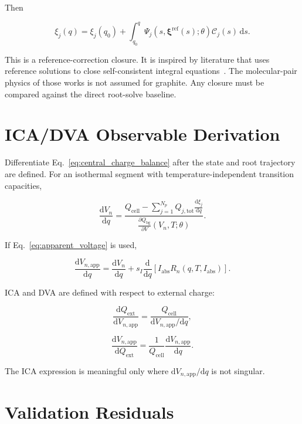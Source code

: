 \documentclass[11pt,a4paper]{article}
\newcommand{\dd}{\mathrm{d}}
\newcommand{\ext}{\mathrm{ext}}
\newcommand{\cell}{\mathrm{cell}}
\newcommand{\bg}{\mathrm{bg}}
\newcommand{\tot}{\mathrm{tot}}
\newcommand{\app}{\mathrm{app}}
\newcommand{\absI}{I_{\mathrm{abs}}}
\begin{document}
Then

\begin{equation}
\xi_j(q)
=
\xi_j(q_0)
+
\int_{q_0}^{q}
\Psi_j(s,\bm{\xi}^{\mathrm{ref}}(s);\theta)
\mathcal{C}_j(s)\,\dd s.
\label{eq:closure_integral}
\end{equation}

This is a reference-correction closure. It is inspired by literature that uses reference solutions to close self-consistent integral equations~\cite{Lee2011Propagator,Son2013Rates,Lee2017Field}. The molecular-pair physics of those works is not assumed for graphite. Any closure must be compared against the direct root-solve baseline.

\section{ICA/DVA Observable Derivation}

Differentiate Eq.~\eqref{eq:central_charge_balance} after the state and root trajectory are defined. For an isothermal segment with temperature-independent transition capacities,

\begin{equation}
\frac{\dd V_n}{\dd q}
=
\frac{
Q_{\cell}
-
\sum_{j=1}^{N_p}Q_{j,\tot}\frac{\dd \xi_j}{\dd q}
}{
\frac{\partial Q_{\bg}}{\partial V}(V_n,T;\theta)
}.
\label{eq:dVn_dq}
\end{equation}

If Eq.~\eqref{eq:apparent_voltage} is used,

\begin{equation}
\frac{\dd V_{n,\app}}{\dd q}
=
\frac{\dd V_n}{\dd q}
+
s_I
\frac{\dd}{\dd q}
\left[
\absI R_n(q,T,\absI)
\right].
\label{eq:dVapp_dq}
\end{equation}

ICA and DVA are defined with respect to external charge:

\begin{equation}
\frac{\dd Q_{\ext}}{\dd V_{n,\app}}
=
\frac{Q_{\cell}}
{\dd V_{n,\app}/\dd q},
\label{eq:ica}
\end{equation}

\begin{equation}
\frac{\dd V_{n,\app}}{\dd Q_{\ext}}
=
\frac{1}{Q_{\cell}}
\frac{\dd V_{n,\app}}{\dd q}.
\label{eq:dva}
\end{equation}

The ICA expression is meaningful only where \(\dd V_{n,\app}/\dd q\) is not singular.

\section{Validation Residuals}
\end{document}
